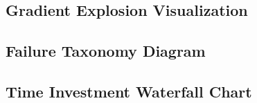 \subsection{Gradient Explosion Visualization}


\subsection{Failure Taxonomy Diagram}


\subsection{Time Investment Waterfall Chart}

